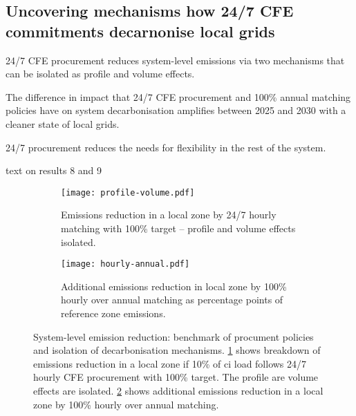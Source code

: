 \subsection{Uncovering mechanisms how 24/7 CFE commitments decarnonise local grids}
\label{subsec:mechanisms}

\vspace{10pt}
\begin{res}
    24/7 CFE procurement reduces system-level \co emissions via two mechanisms that can be isolated as profile and volume effects.
\end{res}

\vspace{5pt}
\begin{res}
    The difference in impact that 24/7 CFE procurement and 100\% annual matching policies have on system decarbonisation amplifies between 2025 and 2030 with a cleaner state of local grids.
\end{res}

\vspace{5pt}
\begin{res}
    24/7 procurement reduces the needs for flexibility in the rest of the system.
\end{res}
   
text on results 8 and 9

\begin{figure}
    \centering
    \begin{subfigure}[t]{0.95\columnwidth}
        \centering
        \caption{Emissions reduction in a local zone by 24/7 hourly matching with 100\% target -- profile and volume effects isolated.}
        \texttt{[image: profile-volume.pdf]}
        \label{fig:10-profile-volume.pdf}
    \end{subfigure}
    \begin{subfigure}[t]{0.95\columnwidth}
        \centering
        \caption{Additional emissions reduction in local zone by 100\% hourly over annual matching as percentage points of reference zone emissions.}
        \texttt{[image: hourly-annual.pdf]}
        \label{fig:10-hourly-annual.pdf}
    \end{subfigure}
    \caption{
        System-level emission reduction: benchmark of procument policies and isolation of decarbonisation mechanisms. 
    \cref{fig:10-profile-volume.pdf} shows breakdown of emissions reduction in a local zone if 10\% of \gls{ci} load follows 24/7 hourly CFE procurement with 100\% target. The profile are volume effects are isolated.
    \cref{fig:10-hourly-annual.pdf} shows additional emissions reduction in a local zone by 100\% hourly over annual matching.}
    \label{fig:decarbonisation_story}
\end{figure}

